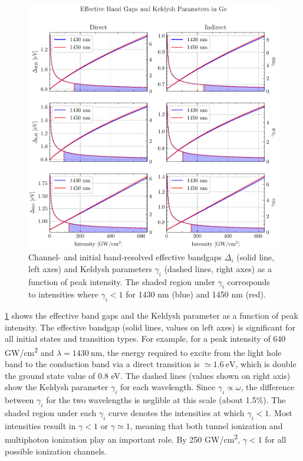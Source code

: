 \begin{figure}
	\centering
	\includegraphics[width=1.0\textwidth]{figures/chap4/Gamma_Gap_Channel_VB_resolved.pdf}
	\caption{Channel- and initial band-resolved effective bandgaps $\Delta_i$ (solid line, left axes) and Keldysh parameters $\gamma_i$ (dashed lines, right axes) as a function of peak intensity. The shaded region under $\gamma_i$ corresponds to intensities where $\gamma_i < 1$ for 1430 nm (blue) and 1450 nm (red).}
	\label{fig:Gamma_Gap_Channel_VB_resolved}
\end{figure}

\cref{fig:Gamma_Gap_Channel_VB_resolved} shows the effective band gaps and the Keldysh parameter as a function of peak intensity. The effective bandgap (solid lines, values on left axes) is significant for all initial states and transition types. For example, for a peak intensity of 640 GW/cm\textsuperscript{2} and $\lambda = 1430 \ \textrm{nm}$, the energy required to excite from the light hole band to the conduction band via a direct transition is $\simeq 1.6 \ \textrm{eV}$, which is double the ground state value of 0.8 eV. The dashed lines (values shown on right axis) show the Keldysh parameter $\gamma_i$ for each wavelength. Since $\gamma_i \propto \omega$, the difference between $\gamma_i$ for the two wavelengths is neglible at this scale (about 1.5\%). The shaded region under each $\gamma_i$ curve denotes the intensities at which $\gamma_i<1$. Most intensities resuilt in $\gamma < 1$ or $\gamma \simeq 1$, meaning that both tunnel ionization and multiphoton ionization play an important role. By 250 GW/cm\textsuperscript{2}, $\gamma < 1$ for all possible ionization channels.

